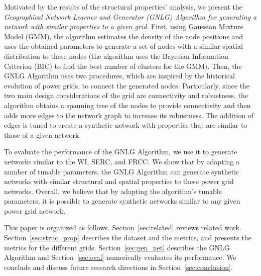 \documentclass[10pt,journal]{IEEEtran}
\begin{document}
Motivated by the results of the structural properties' analysis, we present the \emph{Geographical Network Learner and Generator (GNLG) Algorithm for generating a network with similar properties to a given grid}.
First, using Gaussian Mixture Model (GMM), the algorithm estimates the density of the node positions and uses the obtained parameters to generate a set of nodes with a similar spatial distribution to these nodes (the algorithm uses the Bayesian Information Criterion (BIC) to find the best number of clusters for the GMM).
Then, the GNLG Algorithm uses two procedures, which are inspired by the historical evolution of power grids, to connect the generated nodes. Particularly, since the two main design considerations of the grid are connectivity and robustness, the algorithm obtains a spanning tree of the nodes to provide connectivity and then adds more edges to the network graph to increase its robustness. The addition of edges is tuned to create a synthetic network with properties that are similar to those of a given network.



To evaluate the performance of the GNLG Algorithm, we use it to generate networks similar to the WI, SERC, and FRCC. We show that by adapting a number of tunable parameters, the GNLG Algorithm can generate synthetic networks with similar structural and spatial properties to these power grid networks. Overall, we believe that by adapting the algorithm's tunable parameters, it is possible to generate synthetic networks similar to any given power grid network.

This paper is organized as follows. Section~\ref{sec:related} reviews related work. Section~\ref{sec:struc_prop} describes the dataset and the metrics, and presents the metrics for the different grids. Section~\ref{sec:gen_net} describes the GNLG Algorithm and Section~\ref{sec:eval} numerically evaluates its performance. We conclude and discuss future research directions in Section~\ref{sec:conclusion}.
\end{document}
